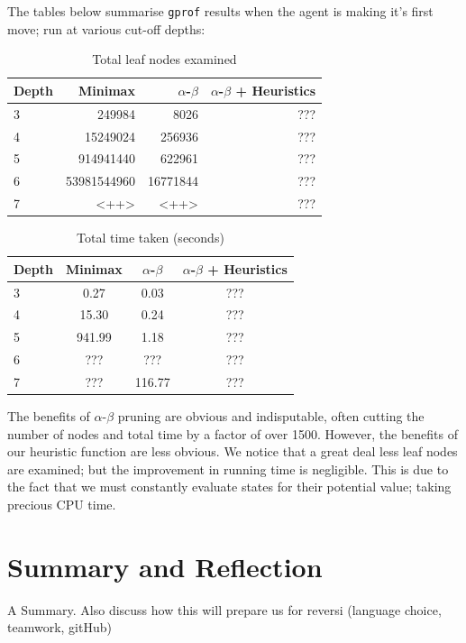\documentclass[10pt,twocolumn]{article}
\begin{document}
The tables below summarise \texttt{gprof} results when the agent is making it's first move;
run at various cut-off depths:
\begin{table}[H]
  \centering
  \caption{Total leaf nodes examined}
  \begin{tabular}{lrrr}
    \toprule
    Depth & Minimax & $\alpha$-$\beta$ & $\alpha$-$\beta$ + Heuristics \\
    \midrule
    3 & 249984 & 8026 & ??? \\
    4 & 15249024 & 256936 & ??? \\
    5 & 914941440 & 622961 & ??? \\
    6 & 53981544960 & 16771844 & ??? \\
    7 & <++> & <++> & ??? \\
    \bottomrule
  \end{tabular}
  \label{tab:leafnodes}
\end{table}
\begin{table}[h]
  \centering
  \caption{Total time taken (seconds)}
  \begin{tabular}{lccc}
    \toprule
    Depth & Minimax & $\alpha$-$\beta$ & $\alpha$-$\beta$ + Heuristics \\
    \midrule
    3 & 0.27 & 0.03 & ??? \\
    4 & 15.30 & 0.24 & ??? \\
    5 & 941.99 & 1.18 & ??? \\
    6 & ??? & ??? & ??? \\
    7 & ??? & 116.77 & ??? \\
    \bottomrule
  \end{tabular}
  \label{tab:time}
\end{table}

The benefits of $\alpha$-$\beta$ pruning are obvious and indisputable, often cutting
the number of nodes and total time by a factor of over 1500.
However, the benefits of our heuristic function are less obvious. We notice that
a great deal less leaf nodes are examined; but the improvement in running time is
negligible. This is due to the fact that we must constantly evaluate states for their
potential value; taking precious CPU time.

\section{Summary and Reflection}
A Summary. Also discuss how this will prepare us for reversi (language choice,
teamwork, gitHub)



\end{document}
